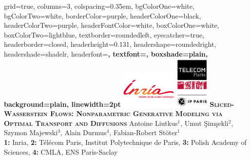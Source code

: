 \documentclass[landscape,final,a0paper,fontscale=0.265]{baposter} %
\begin{document}
\begin{poster}%
  {
  grid=true,
  columns=3,
  colspacing=0.35em,
  bgColorOne=white,
  bgColorTwo=white,
  borderColor=purple,
  headerColorOne=black,
  headerColorTwo=purple,
  headerFontColor=white,
  boxColorOne=white,
  boxColorTwo=lightblue,
  textborder=roundedleft,
  eyecatcher=true,
  headerborder=closed,
  headerheight=0.131\textheight,
  headershape=roundedright,
  headershade=shadelr,
  headerfont=\Large\bf\textsc, %
  textfont={\setlength{\parindent}{1.5em}},
  boxshade=plain,
  background=plain,
  linewidth=2pt
  }
  { 
  \includegraphics[height=5em]{images/inria3.png} 
  \includegraphics[height=7em]{images/telecomparis_endossem_ipp_rvb_600pix.png}} 
  {  \huge \bf\textsc{Sliced-Wasserstein Flows: Nonparametric Generative Modeling via Optimal Transport and Diffusions} \vspace{3pt} }
  {\large {Antoine Liutkus$^1$, \hspace{4pt} Umut \c Sim\c sekli$^2$, \hspace{4pt} Szymon Majewski$^3$, \hspace{4pt} Alain Durmus$^4$, \hspace{4pt} Fabian-Robert St\"{o}ter$^1$} \vspace{4pt}\\
   \normalsize{\textbf{1:} Inria, \textbf{2:} T\'{e}l\'{e}com Paris, Institut Polytechnique de Paris, \textbf{3:} Polish Academy of Sciences, \textbf{4:} CMLA, ENS Paris-Saclay} \vspace{3pt} \\
}
\end{poster}
\end{document}
